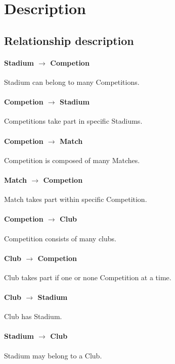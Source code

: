 \documentclass{report}
\begin{document}
\section{Description}
\subsection{Relationship description}

\paragraph{Stadium      $\rightarrow$ Competion}
Stadium can belong to many Competitions.

\paragraph{Competion    $\rightarrow$ Stadium}
Competitions take part in specific Stadiums.

\paragraph{Competion    $\rightarrow$ Match}
Competition is composed of many Matches.

\paragraph{Match        $\rightarrow$ Competion}
Match takes part within specific Competition.

\paragraph{Competion $\rightarrow$ Club}
Competition consists of many clubs.

\paragraph{Club $\rightarrow$ Competion}
Club takes part if one or none Competition at a time.

\paragraph{Club $\rightarrow$ Stadium}
Club has Stadium.

\paragraph{Stadium $\rightarrow$ Club}
Stadium may belong to a Club.
\end{document}
